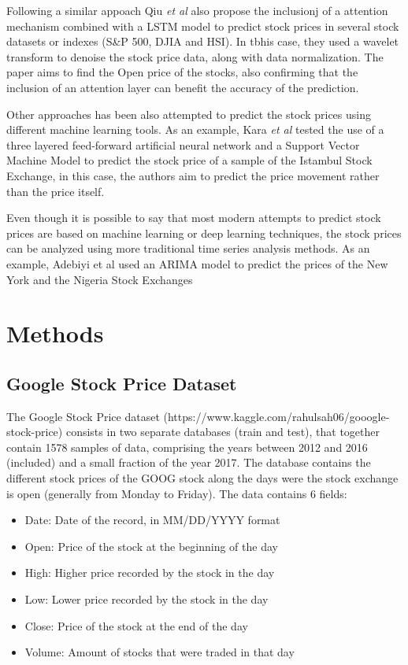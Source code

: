 \documentclass[10pt,twocolumn,letterpaper]{article}
\begin{document}
Following a similar appoach Qiu \textit{et al} also propose the inclusionj of a attention mechanism combined with a LSTM model to predict stock prices in several stock datasets or indexes (S\&P 500, DJIA and HSI). In tbhis case, they used a wavelet transform to denoise the stock price data, along with data normalization. The paper aims to find the Open price of the stocks, also confirming that the inclusion of an attention layer can benefit the accuracy of the prediction.

Other approaches has been also attempted to predict the stock prices using different machine learning tools. As an example, Kara \textit{et al} tested the use of a three layered feed-forward artificial neural network and a Support Vector Machine Model to predict the stock price of a sample of the Istambul Stock Exchange, in this case, the authors aim to predict the price movement rather than the price itself.

Even though it is possible to say that most modern attempts to predict stock prices are based on machine learning or deep learning techniques, the stock prices can be analyzed using more traditional time series analysis methods. As an example, Adebiyi et al \cite{Adebiyi2014} used an ARIMA model to predict the prices of the New York and the Nigeria Stock Exchanges




\section{Methods}

\subsection{Google Stock Price Dataset}

The Google Stock Price dataset (https://www.kaggle.com/rahulsah06/gooogle-stock-price) consists in two separate databases (train and test), that together contain 1578 samples of data, comprising the years between 2012 and 2016 (included) and a small fraction of the year 2017. The database contains the different stock prices of the GOOG stock along the days were the stock exchange is open (generally from Monday to Friday). The data contains 6 fields:

\begin{itemize}
	\item Date: Date of the record, in MM/DD/YYYY format
	\item Open: Price of the stock at the beginning of the day
	\item High: Higher price recorded by the stock in the day
	\item Low: Lower price recorded by the stock in the day
	\item Close: Price of the stock at the end of the day
	\item Volume: Amount of stocks that were traded in that day
\end{itemize}
\end{document}
